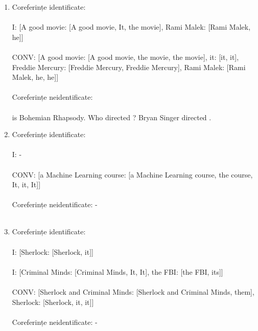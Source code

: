 \documentclass[letterpaper,12pt, dvipsnames, dateno]{article}
\begin{document}
\begin{enumerate}[label=\textbf{\arabic*}]
    \item{
    Coreferințe identificate:\\ \\
    I: [A good movie: [A good movie, It, the movie], Rami Malek: [Rami Malek, he]]\\ \\
    CONV: [A good movie: [A good movie, the movie, the movie], it: [it, it], Freddie Mercury: [Freddie Mercury, Freddie Mercury], Rami Malek: [Rami Malek, he, he]]\\ \\
    Coreferințe neidentificate:\\ \\
     is Bohemian Rhapsody. Who directed ? Bryan Singer directed .
    }
    
     \item{
    Coreferințe identificate:\\ \\
    I: -\\ \\
    CONV: [a Machine Learning course: [a Machine Learning course, the course, It, it, It]]\\ \\
    Coreferințe neidentificate: - \\ \\
    }
    
    \item{
    Coreferințe identificate:\\ \\
    I: [Sherlock: [Sherlock, it]]\\ \\
    I: [Criminal Minds: [Criminal Minds, It, It], the FBI: [the FBI, its]]\\ \\
    CONV: [Sherlock and Criminal Minds: [Sherlock and Criminal Minds, them], Sherlock: [Sherlock, it, it]]\\ \\
    Coreferințe neidentificate: - \\ \\
    }
    
    
    
    
\end{enumerate}
\end{document}
